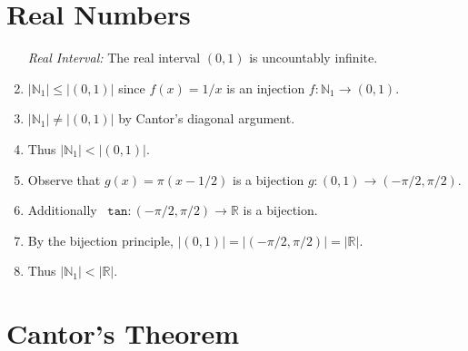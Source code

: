 \documentclass[a4paper, 11pt]{article} %
\newcommand{\set}[1]{\lbrace#1\rbrace} %
\newcommand{\abs}[1]{|#1|} %
\newcommand{\N}{\mathbb{N}}
\newcommand{\R}{\mathbb{R}}
\begin{document}
\begin{enumerate}
\section*{Real Numbers}

\begin{enumerate}
  \item[\it Real Interval:] The real interval $(0,1)$ is uncountably infinite.
    \item $\abs{\N_1} \leq \abs{(0,1)}$ since $f(x) = 1/x$ is an injection $f: \N_1 \to (0,1)$.
    \item $\abs{\N_1} \neq \abs{(0,1)}$ by Cantor's diagonal argument.
    \item Thus $\abs{\N_1} < \abs{(0,1)}$.
    \item Observe that $g(x) = \pi(x - 1/2)$ is a bijection $g: (0,1) \to (-\pi/2,\pi/2)$. 
    \item Additionally~ $\texttt{tan}: (-\pi/2,\pi/2) \to \R$ is a bijection. 
    \item By the bijection principle, $\abs{(0,1)} = \abs{(-\pi/2,\pi/2)} = \abs{\R}$.
    \item Thus $\abs{\N_1} < \abs{\R}$.
\end{enumerate}



\section*{Cantor's Theorem}


\end{enumerate}
\end{document}
